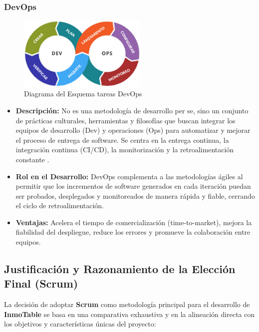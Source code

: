 \subsubsection{DevOps}

\begin{figure}[H]
    \begin{center}
        \includegraphics[width = 0.55\textwidth]{Figuras/devops.png}
    \end{center}
    \caption{\label{fig:devops} Diagrama del Esquema tareas DevOps}
\end{figure}

\begin{itemize}
    \item \textbf{Descripción:} No es una metodología de desarrollo per se, sino un conjunto de prácticas culturales, herramientas y filosofías que buscan integrar los equipos de desarrollo (Dev) y operaciones (Ops) para automatizar y mejorar el proceso de entrega de software. Se centra en la entrega continua, la integración continua (CI/CD), la monitorización y la retroalimentación constante \cite{atlassian2024devops}.
    \item \textbf{Rol en el Desarrollo:} DevOps complementa a las metodologías ágiles al permitir que los incrementos de software generados en cada iteración puedan ser probados, desplegados y monitoreados de manera rápida y fiable, cerrando el ciclo de retroalimentación.
    \item \textbf{Ventajas:} Acelera el tiempo de comercialización (time-to-market), mejora la fiabilidad del despliegue, reduce los errores y promueve la colaboración entre equipos.
\end{itemize}


\subsection{Justificación y Razonamiento de la Elección Final (Scrum)}

La decisión de adoptar \textbf{Scrum} como metodología principal para el desarrollo de \textbf{InmoTable} se basa en una comparativa exhaustiva y en la alineación directa con los objetivos y características únicas del proyecto:

